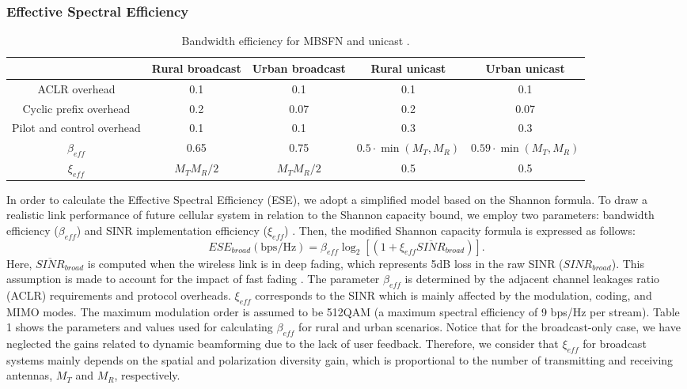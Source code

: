 \documentclass[journal]{IEEEtran}
\begin{document}
\subsubsection{	\textbf{Effective Spectral Efficiency}}
\begin{table*}[t]
\caption{Bandwidth efficiency for MBSFN and unicast \cite{Adachi,Zheng}.}\label{table:eff}
\centering
\begin{tabular}{|c|c c|c c|}
  \hline
& Rural broadcast & Urban broadcast & Rural unicast & Urban unicast \\
    \hline
  ACLR overhead & 0.1 & 	0.1 & 0.1 & 	0.1 \\
 Cyclic prefix overhead&	0.2 &	0.07&	0.2 &	0.07\\
Pilot and control overhead&	0.1	&0.1&	0.3 &	0.3\\
$\beta_{eff}$ &	0.65&	0.75 & $0.5\cdot \min(M_T,M_R)$	& $0.59\cdot \min(M_T,M_R)$\\
  $\xi_{eff}$ & $M_TM_R/2$ & $M_TM_R/2$&	0.5&	0.5\\
\hline
\end{tabular}
\end{table*}
In order to calculate the Effective Spectral Efficiency (ESE), we adopt a simplified model based on the Shannon formula. To draw a realistic link performance of future cellular system in relation to the Shannon capacity bound, we employ two parameters: bandwidth efficiency ($\beta_{eff}$) and SINR implementation efficiency ($\xi_{eff}$) \cite{Mogensen}. Then, the modified Shannon capacity formula is expressed as follows:
\begin{equation}\label{ESE}
  	ESE_{broad}(\textrm{bps/Hz})=\beta_{eff}\log_2⁡[(1+\xi_{eff} \overline{SINR}_{broad})].	
\end{equation}
Here, $\overline{SINR}_{broad}$ is computed when the wireless link is in deep fading, which represents 5dB loss in the raw SINR (${SINR}_{broad}$). This assumption is made to account for the impact of fast fading \cite{Adachi}. The parameter $\beta_{eff}$ is determined by the adjacent channel leakages ratio (ACLR) requirements and protocol overheads. $\xi_{eff}$ corresponds to the SINR which is mainly affected by the modulation, coding, and MIMO modes. The maximum modulation order is assumed to be 512QAM (a maximum spectral efficiency of 9 bps/Hz per stream). Table 1 shows the parameters and values used for calculating $\beta_{eff}$ for rural and urban scenarios. Notice that for the broadcast-only case, we have neglected the gains related to dynamic beamforming due to the lack of user feedback. Therefore, we consider that $\xi_{eff}$ for broadcast systems mainly depends on the spatial and polarization diversity gain, which is proportional to the number of transmitting and receiving antennas, $M_T$ and $M_R$, respectively.
\end{document}
